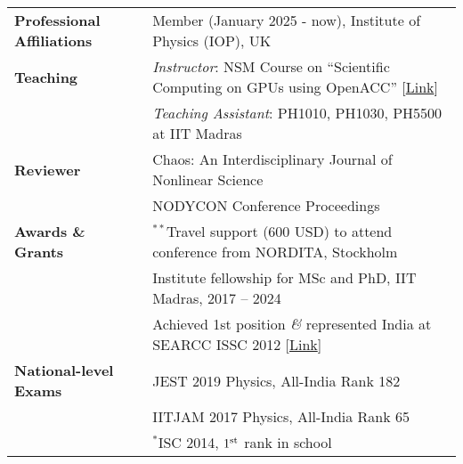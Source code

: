 \begin{longtable}[l]{@{} m{4.75cm} m{13cm}}

\textbf{Professional Affiliations} & Member (January 2025 - now), Institute of Physics (IOP), UK\\[0.3cm]

\textbf{Teaching} & \textit{Instructor}: NSM Course on ``Scientific Computing on GPUs using OpenACC'' [\href{https://www.cse.iitm.ac.in/~rupesh/events/openacc23/}{Link}]\\ 
& \textit{Teaching Assistant}: PH1010, PH1030, PH5500 at IIT Madras\\[0.3cm]

\textbf{Reviewer} & Chaos: An Interdisciplinary Journal of Nonlinear Science \\
                                    & NODYCON Conference Proceedings \\ [0.3cm]

\textbf{Awards \& Grants} & $^{**}$Travel support (600 USD) to attend conference from NORDITA, Stockholm\\
                                         & Institute fellowship for MSc and PhD, IIT Madras, 2017 -- 2024\\
                                         & Achieved 1st position \textit{\&} represented India at SEARCC ISSC 2012 [\href{https://drive.google.com/file/d/1prSSTmaBEpoaM3C4Ct2ShxLFX_cAhgtH/view?usp=sharing}{Link}]\\[0.3cm]

\textbf{National-level Exams} & JEST 2019 Physics, All-India Rank 182\\
                                                & IITJAM 2017 Physics, All-India Rank 65\\
                                                & $^{*}$ISC 2014, $1^{\rm st}$ rank in school
\end{longtable}